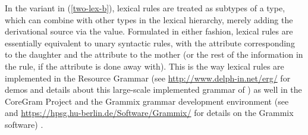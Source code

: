 \documentclass[output=paper
 	        ,biblatex
                ,babelshorthands
                ,newtxmath
                ,draftmode
                ,colorlinks, citecolor=brown
]{langscibook}
\begin{document}
\begin{exe}
\ex \label{two-lex}
\begin{xlist}
\ex \label{two-lex-a}
\ex \label{two-lex-b}
\end{xlist}
\end{exe}



In the variant in (\ref{two-lex-b}), lexical rules are treated as subtypes of a   type, which can combine with other types in the lexical hierarchy, merely adding the derivational source via the  value. 
Formulated in either fashion, lexical rules are essentially equivalent to unary syntactic rules, with the  attribute corresponding to the daughter and the  attribute to the mother (or the rest of the information in the rule, if the  attribute is done away with). This is the way lexical rules are implemented in the  Resource Grammar (see \url{http://www.delph-in.net/erg/} for demos and details about this large-scale implemented grammar of ) as well in the CoreGram Project and the Grammix grammar development environment  (see \citealt{MuellerGrammix} and \url{https://hpsg.hu-berlin.de/Software/Grammix/} for details on the Grammix software) .
\end{document}
